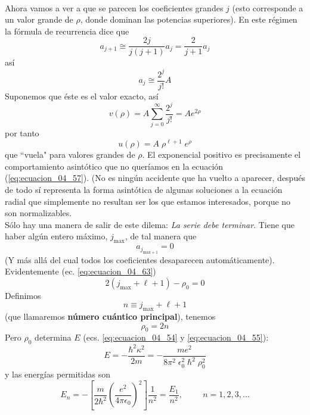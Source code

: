 \\
Ahora vamos a ver a que se parecen los coeficientes grandes $j$ (esto corresponde a un valor grande de $\rho$, donde dominan las potencias superiores). En este régimen la fórmula de recurrencia dice que
\[ a_{j+1} \cong \dfrac{2 j}{j (j + 1)} a_{j} =  \dfrac{2}{j + 1} a_{j} \]
así
\begin{equation}
a_{j} \cong \dfrac{2^{j}}{j!} A
\label{eq:ecuacion_04_64}
\end{equation}
Suponemos que éste es el valor exacto, así
\[ v(\rho) = A \sum_{j=0}^{\infty} \dfrac{2^{j}}{j!} =  A e^{2 \rho} \]
por tanto
\begin{equation}
u(\rho) = A \; \rho^{\ell + 1} \; e^{\rho}
\label{eq:ecuacion_04_65}
\end{equation}
que ``vuela" para valores grandes de $\rho$. El exponencial positivo es precisamente el comportamiento asintótico que no queríamos en la ecuación (\ref{eq:ecuacion_04_57}). (No es ningún accidente que ha vuelto a aparecer, después de todo
sí representa la forma asintótica de algunas soluciones a la ecuación radial que simplemente no resultan ser los que estamos interesados, porque no son normalizables.
\\
Sólo hay una manera de salir de este dilema: \emph{La serie debe terminar}. Tiene que haber algún entero máximo, $j_{\text{max}}$, de tal manera que
\begin{equation}
a_{j_{\text{max}+1}} = 0
\label{eq:ecuacion_04_66}
\end{equation}
(Y más allá del cual todos los coeficientes desaparecen automáticamente). Evidentemente (ec. \ref{eq:ecuacion_04_63})
\[ 2 (j_{\text{max}} + \ell + 1) - \rho_{0} = 0 \]
Definimos
\begin{equation}
n \equiv j_{\text{max}} + \ell + 1
\label{eq:ecuacion_04_67}
\end{equation}
(que llamaremos \textbf{número cuántico principal}), tenemos
\begin{equation}
\rho_{0} = 2 n
\label{eq:ecuacion_04_68}
\end{equation}
Pero $\rho_{0}$ determina $E$ (ecs. \ref{eq:ecuacion_04_54} y \ref{eq:ecuacion_04_55}):
\begin{equation}
E = - \dfrac{\hbar^{2} \kappa^{2}}{2 m } = - \dfrac{m e^{2}}{8 \pi^{2} \; \epsilon_{0}^{2} \; \hbar^{2} \; \rho_{0}^{2}}
\label{eq:ecuacion_04_69}
\end{equation}
y las energías permitidas son
\begin{equation}
\boxed{E_{n} = - \left[ \dfrac{m}{2 \hbar^{2}} \left( \dfrac{e^{2}}{4 \pi \epsilon_{0}} \right)^{2} \right] \dfrac{1}{n^{2}} = \dfrac{E_{1}}{n^{2}}, \hspace{1cm} n = 1, 2, 3, \ldots}
\label{eq:ecuacion_04_70}
\end{equation}
